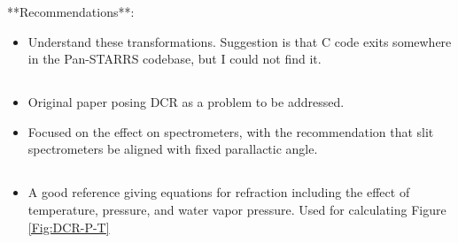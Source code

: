 \documentclass[]{article}
\begin{document}
**Recommendations**:
\begin{itemize}
	\item Understand these transformations. Suggestion is that C code exits somewhere in the Pan-STARRS codebase, but I could not find it.
\end{itemize}

\subsection{\cite{Cuby1998}}

\subsection{\cite{Filippenko1982}}
\begin{itemize}
	\item Original paper posing DCR as a problem to be addressed.
	\item Focused on the effect on spectrometers, with the recommendation that slit spectrometers be aligned with fixed parallactic angle.
\end{itemize}


\subsection{\cite{AlejandroPlazas2012}}

\subsection{\cite{Stone1996}}
\begin{itemize}
	\item A good reference giving equations for refraction including the effect of temperature, pressure, and water vapor pressure. Used for calculating Figure \ref{Fig:DCR-P-T} 
\end{itemize}




\end{document}
